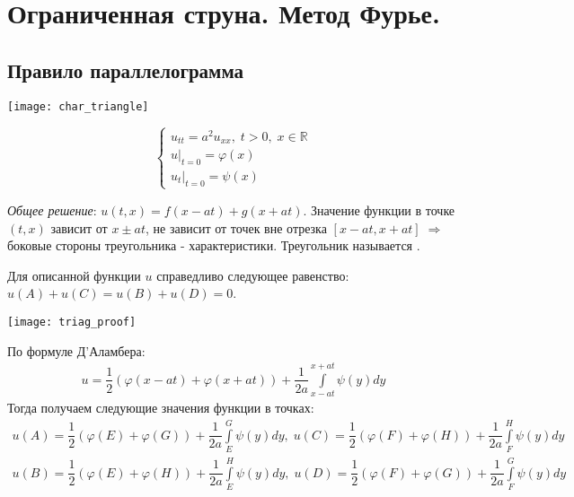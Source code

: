 \chapter{Ограниченная струна. Метод Фурье.}
\label{cha:9}

\section*{Правило параллелограмма}

\begin{remem}

	\begin{multicols}{2}
		\begin{flushleft}
			\texttt{[image: char\_triangle]} 
		\end{flushleft}

		\columnbreak

		\hfill \break \hfill \break \hfill \break
		$$\begin{cases}
			u_{tt} = a^2 u_{xx}, \; t > 0, \; x \in \mathbb{R} \\
			u|_{t = 0} = \varphi (x) \\
			u_t |_{t = 0} = \psi (x)
		\end{cases}$$
	\end{multicols}

	\textit{Общее решение}: $ u(t, x) = f(x - at) + g(x + at). $ Значение функции в точке $ (t, x) $ зависит от $ x \pm at $, не зависит от точек вне отрезка $ [x - at, x + at] \; \Rightarrow $  боковые стороны треугольника - характеристики. Треугольник называется .
\end{remem}

\begin{clair}
	Для описанной функции $u$ справедливо следующее равенство: $ u(A) + u(C) = u(B) + u(D) = 0 $.
	\begin{center}
		\texttt{[image: triag\_proof]}
	\end{center}
\end{clair}
\begin{Proof}
	По формуле Д'Аламбера: 
	$$\begin{gathered}
		u = \dfrac{1}{2}(\varphi(x - at) + \varphi(x + at)) + \dfrac{1}{2a} \int\limits_{x - at}^{x + at} \psi(y)dy
	\end{gathered}$$
	Тогда получаем следующие значения функции в точках:
	$$\begin{gathered}
		u(A) = \dfrac{1}{2}(\varphi(E) + \varphi(G)) + \dfrac{1}{2a} \int\limits_{E}^{G} \psi(y)dy, \; u(C) = \dfrac{1}{2}(\varphi(F) + \varphi(H)) + \dfrac{1}{2a} \int\limits_{F}^{H} \psi(y)dy \\
		u(B) = \dfrac{1}{2}(\varphi(E) + \varphi(H)) + \dfrac{1}{2a} \int\limits_{E}^{H} \psi(y)dy, \; u(D) = \dfrac{1}{2}(\varphi(F) + \varphi(G)) + \dfrac{1}{2a} \int\limits_{F}^{G} \psi(y)dy
	\end{gathered}$$
\end{Proof}

